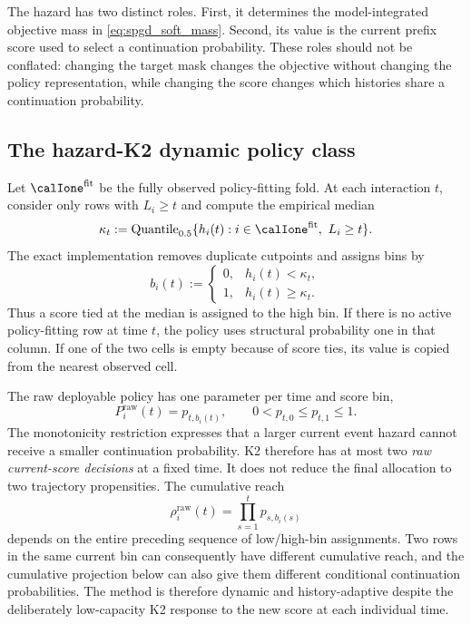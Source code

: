 The hazard has two distinct roles.  First, it determines the model-integrated
objective mass in \eqref{eq:spgd_soft_mass}.  Second, its value is the current
prefix score used to select a continuation probability.  These roles should
not be conflated: changing the target mask changes the objective without
changing the policy representation, while changing the score changes which
histories share a continuation probability.

\subsection{The hazard-K2 dynamic policy class}
\label{sec:spgd_k2}

Let $\calIone^{\mathrm{fit}}$ be the fully observed policy-fitting fold.  At
each interaction $t$, consider only rows with $L_i\geq t$ and compute the
empirical median
\begin{equation}
    \kappa_t
    :=\operatorname{Quantile}_{0.5}
       \{h_i(t):i\in\calIone^{\mathrm{fit}},\ L_i\geq t\}.
    \label{eq:spgd_median_cutpoint}
\end{equation}
The exact implementation removes duplicate cutpoints and assigns bins by
\begin{equation}
    b_i(t):=
    \begin{cases}
       0,&h_i(t)<\kappa_t,\\
       1,&h_i(t)\geq\kappa_t.
    \end{cases}
    \label{eq:spgd_bin_assignment}
\end{equation}
Thus a score tied at the median is assigned to the high bin.  If there is no
active policy-fitting row at time $t$, the policy uses structural probability
one in that column.  If one of the two cells is empty because of score ties,
its value is copied from the nearest observed cell.

The raw deployable policy has one parameter per time and score bin,
\begin{equation}
    P_i^{\mathrm{raw}}(t)=p_{t,b_i(t)},
    \qquad
    0<p_{t,0}\leq p_{t,1}\leq1.
    \label{eq:spgd_k2_policy}
\end{equation}
The monotonicity restriction expresses that a larger current event hazard
cannot receive a smaller continuation probability.  K2 therefore has at most
two \emph{raw current-score decisions} at a fixed time.  It does not reduce
the final allocation to two trajectory propensities.  The cumulative reach
\begin{equation}
    \rho_i^{\mathrm{raw}}(t)
      =\prod_{s=1}^{t}p_{s,b_i(s)}
\end{equation}
depends on the entire preceding sequence of low/high-bin assignments.  Two
rows in the same current bin can consequently have different cumulative
reach, and the cumulative projection below can also give them different
conditional continuation probabilities.  The method is therefore dynamic
and history-adaptive despite the deliberately low-capacity K2 response to the
new score at each individual time.

